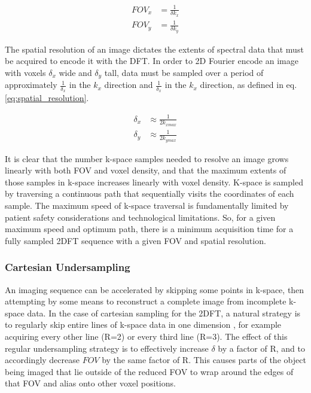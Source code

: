 \begin{equation}\label{eq:fov}
    \begin{aligned}
        FOV_x &= \frac{1}{\delta k_x}\\
        FOV_y &= \frac{1}{\delta k_y}
    \end{aligned}
\end{equation}

The spatial resolution of an image dictates the extents of spectral data that must be acquired to encode it with the
DFT. In order to 2D Fourier encode an image with voxels $\delta_x$ wide and $\delta_y$ tall, data must be sampled over a
period of approximately $\frac{1}{\delta_x}$ in the $k_x$ direction and $\frac{1}{\delta_x}$ in the $k_x$ direction, as
defined in eq. \ref{eq:spatial_resolution}.


\begin{equation}\label{eq:spatial_resolution}
    \begin{aligned}
        \delta_x &\approx \frac{1}{2k_{xmax}}\\
        \delta_y &\approx \frac{1}{2k_{ymax}}
    \end{aligned}
\end{equation}

It is clear that the number k-space samples needed to resolve an image grows linearly with both FOV and voxel density,
and that the maximum extents of those samples in k-space increases linearly with voxel density. K-space is sampled by
traversing a continuous path that sequentially visits the coordinates of each sample. The maximum speed of k-space
traversal is fundamentally limited by patient safety considerations and technological limitations. So, for a given
maximum speed and optimum path, there is a minimum acquisition time for a fully sampled 2DFT sequence with a given FOV
and spatial resolution.

\subsubsection{Cartesian Undersampling}
An imaging sequence can be accelerated by skipping some points in k-space, then attempting by some means to reconstruct
a complete image from incomplete k-space data. In the case of cartesian sampling for the 2DFT, a natural strategy is to
regularly skip entire lines of k-space data in one dimension \cite{Pruessmann1999}, for example acquiring every other
line (R=2) or every third line (R=3). The effect of this regular undersampling strategy is to effectively increase
$\delta$ by a factor of R, and to accordingly decrease $FOV$ by the same factor of R. This causes parts of the object
being imaged that lie outside of the reduced FOV to wrap around the edges of that FOV and alias onto other voxel
positions.

